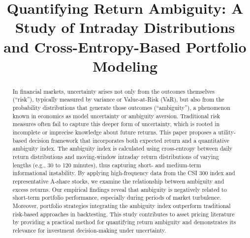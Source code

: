 \documentclass[preprint,12pt,authoryear]{elsarticle}
\begin{document}
\begin{frontmatter}



\title{Quantifying Return Ambiguity: A Study of Intraday Distributions and Cross-Entropy-Based Portfolio Modeling} %

\begin{abstract}
In financial markets, uncertainty arises not only from the outcomes themselves (``risk''), typically measured by variance or Value-at-Risk (VaR), but also from the probability distributions that generate those outcomes (``ambiguity''), a phenomenon known in economics as model uncertainty or ambiguity aversion. Traditional risk measures often fail to capture this deeper form of uncertainty, which is rooted in incomplete or imprecise knowledge about future returns. This paper proposes a utility-based decision framework that incorporates both expected return and a quantitative ambiguity index. The ambiguity index is calculated using cross-entropy between daily return distributions and moving-window intraday return distributions of varying lengths (e.g., 30 to 120 minutes), thus capturing short- and medium-term informational instability. By applying high-frequency data from the CSI 300 index and representative A-share stocks, we examine the relationship between ambiguity and excess returns. Our empirical findings reveal that ambiguity is negatively related to short-term portfolio performance, especially during periods of market turbulence. Moreover, portfolio strategies integrating the ambiguity index outperform traditional risk-based approaches in backtesting. This study contributes to asset pricing literature by providing a practical method for quantifying return ambiguity and demonstrates its relevance for investment decision-making under uncertainty.
\end{abstract}



\end{frontmatter}
\end{document}
